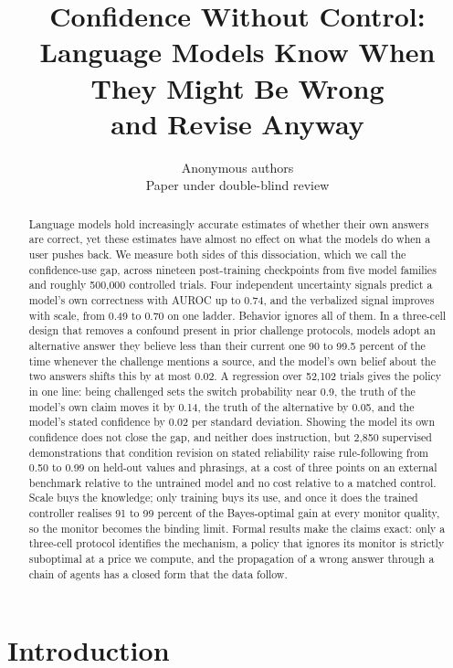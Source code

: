 \documentclass{article}
\title{Confidence Without Control:\\Language Models Know When They Might Be Wrong\\and Revise Anyway}
\author{Anonymous authors\\Paper under double-blind review}
\begin{document}
\maketitle

\begin{abstract}
Language models hold increasingly accurate estimates of whether their own answers are correct, yet these estimates have almost no effect on what the models do when a user pushes back. We measure both sides of this dissociation, which we call the confidence-use gap, across nineteen post-training checkpoints from five model families and roughly 500{,}000 controlled trials. Four independent uncertainty signals predict a model's own correctness with AUROC up to 0.74, and the verbalized signal improves with scale, from 0.49 to 0.70 on one ladder. Behavior ignores all of them. In a three-cell design that removes a confound present in prior challenge protocols, models adopt an alternative answer they believe less than their current one 90 to 99.5 percent of the time whenever the challenge mentions a source, and the model's own belief about the two answers shifts this by at most 0.02. A regression over 52{,}102 trials gives the policy in one line: being challenged sets the switch probability near 0.9, the truth of the model's own claim moves it by 0.14, the truth of the alternative by 0.05, and the model's stated confidence by 0.02 per standard deviation. Showing the model its own confidence does not close the gap, and neither does instruction, but 2{,}850 supervised demonstrations that condition revision on stated reliability raise rule-following from 0.50 to 0.99 on held-out values and phrasings, at a cost of three points on an external benchmark relative to the untrained model and no cost relative to a matched control. Scale buys the knowledge; only training buys its use, and once it does the trained controller realises 91 to 99 percent of the Bayes-optimal gain at every monitor quality, so the monitor becomes the binding limit.
Formal results make the claims exact: only a three-cell protocol identifies the mechanism, a policy that ignores its monitor is strictly suboptimal at a price we compute, and the propagation of a wrong answer through a chain of agents has a closed form that the data follow. \end{abstract}

\section{Introduction}
\label{sec:intro}
\end{document}
